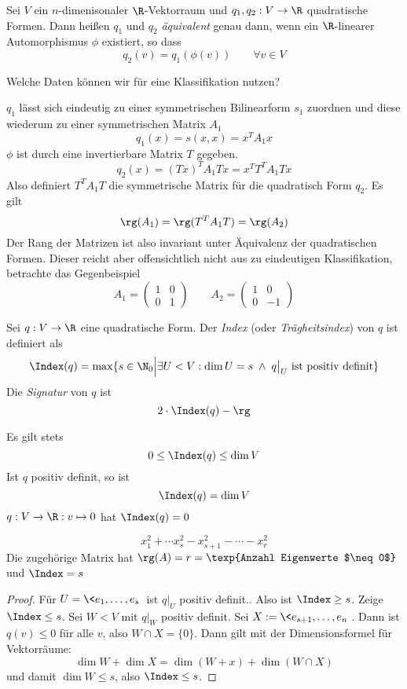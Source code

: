 \documentclass[a4paper, 10pt]{scrbook}
\begin{document}
\begin{df}
	\label{df:15.8}
	Sei $V$ ein $n$-dimenisonaler $\R$-Vektorraum und $q_1,q_2 : V\to \R$ quadratische Formen.
	Dann heißen $q_1$ und $q_2$ \emph{äquivalent} genau dann, wenn ein $\R$-linearer Automorphismus $\phi$ existiert, so dass
	\[
		q_2(v) = q_1(\phi(v)) \qquad \forall v\in V
	\]
\end{df}

Welche Daten können wir für eine Klassifikation nutzen?

$q_1$ lässt sich eindeutig zu einer symmetrischen Bilinearform $s_1$ zuordnen und diese wiederum zu einer symmetrischen Matrix $A_1$
\[
	q_1(x) = s(x,x) = x^TA_1x
\]
$\phi$ ist durch eine invertierbare Matrix $T$ gegeben.
\[
	q_2(x) = (Tx)^TA_1Tx = x^T T^TA_1Tx
\]
Also definiert $T^TA_1T$ die symmetrische Matrix für die quadratisch Form $q_2$.
Es gilt
\[
	\rg(A_1) = \rg(T^TA_1T) = \rg(A_2)
\]
Der Rang der Matrizen ist also invariant unter Äquivalenz der quadratischen Formen.
Dieser reicht aber offensichtlich nicht aus zu eindeutigen Klassifikation, betrachte das Gegenbeispiel
\[
	A_1 = \begin{pmatrix}1&0\\0&1\end{pmatrix}\qquad A_2 = \begin{pmatrix}1&0\\0&-1\end{pmatrix}
\]


\begin{df}
	\label{df:15.9}
	Sei $q:V\to \R$ eine quadratische Form.
	Der \emph{Index} (oder \emph{Trägheitsindex}) von $q$ ist definiert als
	\[
		\Index(q) = \max\{s \in \N_0 \Big| \exists U < V : \dim U=s \; \land\; q\big|_U \text{ ist positiv definit}\}
	\]
	Die \emph{Signatur} von $q$ ist
	\[
		2 \cdot \Index(q) - \rg
	\]
	\begin{note}
		Es gilt stets
		\[
			0 \le \Index(q) \le \dim V
		\]
		Ist $q$ positiv definit, so ist
		\[
			\Index(q) = \dim V
		\]
		$q:V\to \R: v\mapsto 0$ hat $\Index(q)=0$
	\end{note}
\end{df}

\begin{ex}
	\[
		x_1^2 + \dotsb x_s^2 - x_{s+1}^2 - \dotsb - x_r^2
	\]
	Die zugehörige Matrix hat $\rg(A) = r = \texp{Anzahl Eigenwerte $\neq 0$}$ und $\Index=s$
	
	\begin{proof}
		Für $U = \<e_1,\dotsc, e_s\>$ ist $q|_U$ positiv definit..
		Also ist $\Index \ge s$.
		Zeige $\Index \le s$.
		Sei $W< V$ mit $q|_W$ positiv definit.
		Sei $X:= \<e_{s+1},\dotsc, e_n\>$.
		Dann ist $q(v) \le 0$ für alle $v$, also $W\cap X = \{0\}$.
		Dann gilt mit der Dimensionsformel für Vektorräume:
		\[
			\dim W + \dim X = \dim (W+x) + \dim(W\cap X)
		\]
		und damit $\dim W \le s$, also $\Index \le s$.
	\end{proof}	
\end{ex}
\end{document}
